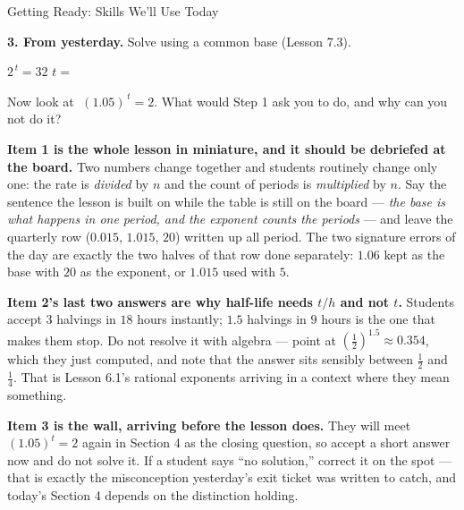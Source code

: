 \documentclass[10pt]{article}
\begin{document}
\begin{notesbox}{Getting Ready: Skills We'll Use Today}
\vspace{0.22in}

\textbf{3. From yesterday.} Solve using a common base (Lesson 7.3).

\vspace{4pt}
\hspace*{1.2em} $2^{\,t} = 32$ \hfill $t=$ 

\vspace{6pt}
\hspace*{1.2em} Now look at $\;(1.05)^{\,t} = 2$. \; What would Step 1 ask you to do, and why can you
not do it? 

\end{notesbox}

\begin{teachernote}
\textbf{Item 1 is the whole lesson in miniature, and it should be debriefed at the board.} Two numbers
change together and students routinely change only one: the rate is \emph{divided} by $n$ and the count
of periods is \emph{multiplied} by $n$. Say the sentence the lesson is built on while the table is
still on the board --- \emph{the base is what happens in one period, and the exponent counts the
periods} --- and leave the quarterly row ($0.015$, $1.015$, $20$) written up all period. The two
signature errors of the day are exactly the two halves of that row done separately: $1.06$ kept as the
base with $20$ as the exponent, or $1.015$ used with $5$.

\textbf{Item 2's last two answers are why half-life needs $t/h$ and not $t$.} Students accept $3$
halvings in $18$ hours instantly; $1.5$ halvings in $9$ hours is the one that makes them stop. Do not
resolve it with algebra --- point at $\left(\frac12\right)^{1.5}\approx0.354$, which they just
computed, and note that the answer sits sensibly between $\frac12$ and $\frac14$. That is Lesson 6.1's
rational exponents arriving in a context where they mean something.

\textbf{Item 3 is the wall, arriving before the lesson does.} They will meet
$(1.05)^{t}=2$ again in Section 4 as the closing question, so accept a short answer now and do not
solve it. If a student says ``no solution,'' correct it on the spot --- that is exactly the
misconception yesterday's exit ticket was written to catch, and today's Section 4 depends on the
distinction holding.
\end{teachernote}
\end{document}
